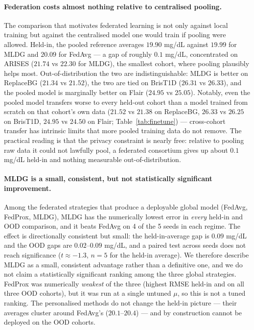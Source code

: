 \documentclass[10pt,letterpaper]{article}
\begin{document}
\paragraph{Federation costs almost nothing relative to centralised pooling.} The
comparison that motivates federated learning is not only against local training
but against the centralised model one would train if pooling were allowed.
Held-in, the pooled reference averages $19.90$ mg/dL against $19.99$ for MLDG
and $20.09$ for FedAvg --- a gap of roughly $0.1$ mg/dL, concentrated on ARISES
($21.74$ vs $22.30$ for MLDG), the smallest cohort, where pooling plausibly
helps most. Out-of-distribution the two are indistinguishable: MLDG is better on
ReplaceBG ($21.34$ vs $21.52$), the two are tied on BrisT1D ($26.31$ vs
$26.33$), and the pooled model is marginally better on Flair ($24.95$ vs
$25.05$). Notably, even the pooled model transfers worse to every held-out
cohort than a model trained from scratch on that cohort's own data
($21.52$ vs $21.38$ on ReplaceBG, $26.33$ vs $26.25$ on BrisT1D, $24.95$ vs
$24.50$ on Flair; Table~\ref{tab:finetune}) --- cross-cohort transfer has
intrinsic limits that more pooled training data do not remove. The practical
reading is that the privacy constraint is nearly free: relative to pooling raw
data it could not lawfully pool, a federated consortium gives up about
$0.1$ mg/dL held-in and nothing measurable out-of-distribution.

\paragraph{MLDG is a small, consistent, but not statistically significant
improvement.} Among the federated strategies that produce a deployable global
model (FedAvg, FedProx, MLDG), MLDG
has the numerically lowest error in \emph{every} held-in and OOD comparison, and
it beats FedAvg on 4 of the 5 seeds in each regime. The effect is directionally
consistent but small: the held-in-average gap is $0.09$ mg/dL and the OOD gaps
are $0.02$--$0.09$ mg/dL, and a paired test across seeds does not reach
significance ($t \approx -1.3$, $n=5$ for the held-in average). We therefore
describe MLDG as a small, consistent advantage rather than a definitive one, and
we do not claim a statistically significant ranking among the three global
strategies. FedProx was numerically \emph{weakest} of the three (highest RMSE
held-in and on all three OOD cohorts), but it was run at a single untuned $\mu$,
so this is not a tuned ranking. The personalised methods do not change the
held-in picture --- their averages cluster around FedAvg's ($20.1$--$20.4$) ---
and by construction cannot be deployed on the OOD cohorts.
\end{document}
